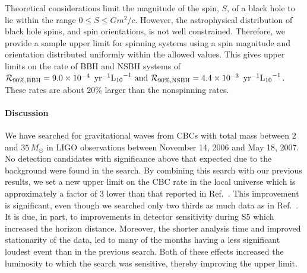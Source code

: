 Theoretical considerations limit the magnitude of the spin, $S$, of a
black hole to lie within the range $0 \le S \le G m^{2}/c$.  However,
the astrophysical distribution of black hole spins, and spin
orientations, is not well constrained.  Therefore, we provide a sample
upper limit for spinning systems using a spin magnitude and orientation
distributed uniformly within the allowed values.  This gives upper
limits on the rate of \ac{BBH} and \ac{NSBH} systems of
%
$\mathcal{R}_{90\%,{\rm BBH}} = 9.0 \times 10^{-4}\,
\textrm{ yr}^{-1}\mathrm{L_{10}}^{-1} \text{ and }
\mathcal{R}_{90\%,{\rm NSBH}} =  4.4 \times 10^{-3}\,
\textrm{ yr}^{-1}\mathrm{L_{10}}^{-1} \, .$
%
These rates are about $20\%$ larger than the nonspinning rates.

\paragraph{Discussion}

We have searched for gravitational waves from CBCs with total mass
between $2$ and $35\, M_\odot$ in \ac{LIGO} observations between November
14, 2006 and May 18, 2007.  No detection candidates with significance
above that expected due to the background were found in the search. By
combining this search with our previous results, we set a new upper
limit on the CBC rate in the local universe which is approximately a
factor of $3$ lower than that reported in
Ref.~\cite{Collaboration:2009tt}.  This improvement is significant, even
though we searched only two thirds as much data as in
Ref.~\cite{Collaboration:2009tt}.  It is due, in part, to improvements
in detector sensitivity during S5 which increased the horizon distance.
Moreover, the shorter analysis time and improved stationarity of
the data, led to many of the months having a less significant loudest
event than in the previous search.  Both of these effects increased the
luminosity to which the search was sensitive, thereby improving the
upper limit.

